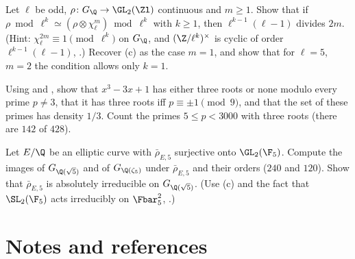 \begin{exercise}\label{exer:galois:twist-power}
Let $\ell$ be odd, $\rho\colon G_\Q\to\GL_2(\Zl)$ continuous and $m\ge1$. Show that if $\rho\bmod\ell^k\simeq(\rho\otimes\chi_\ell^m)\bmod\ell^k$ with $k\ge1$, then
$\ell^{k-1}(\ell-1)$ divides $2m$. (Hint: $\chi_\ell^{2m}\equiv1\pmod{\ell^k}$ on $G_\Q$, and $(\Z/\ell^k)^\times$ is cyclic of order $\ell^{k-1}(\ell-1)$, .) Recover
(c) as the case $m=1$, and show that for $\ell=5$, $m=2$ the condition allows only $k=1$.
\end{exercise}

\begin{exercise}\label{exer:galois:x3-3x+1}
Using  and , show that $x^3-3x+1$ has either three roots or none modulo every prime $p\ne3$, that it has three roots
iff $p\equiv\pm1\pmod9$, and that the set of these primes has density $1/3$. Count the primes $5\le p<3000$ with three roots (there are $142$ of $428$).
\end{exercise}

\begin{exercise}\label{exer:galois:restriction-index}
Let $E/\Q$ be an elliptic curve with $\bar\rho_{E,5}$ surjective onto $\GL_2(\F_5)$. Compute the images of $G_{\Q(\sqrt5)}$ and of $G_{\Q(\zeta_5)}$ under $\bar\rho_{E,5}$ and their
orders ($240$ and $120$). Show that $\bar\rho_{E,5}$ is absolutely irreducible on $G_{\Q(\sqrt5)}$. (Use (c) and the fact that $\SL_2(\F_5)$ acts
irreducibly on $\Fbar_5^2$, .)
\end{exercise}

\section{Notes and references}\label{sec:galois:notes}

